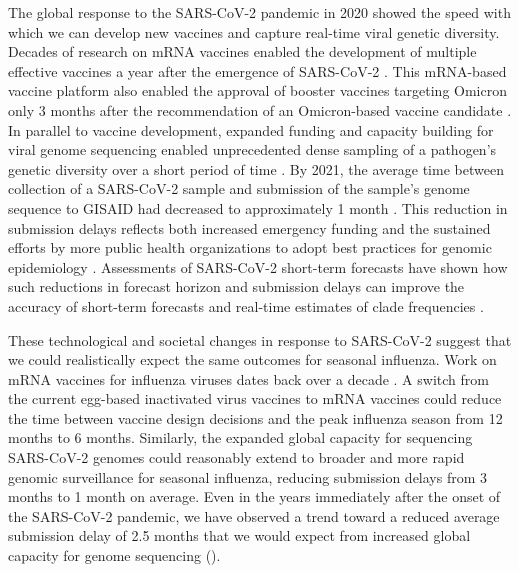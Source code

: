 \documentclass[9pt,lineno]{elife}
\begin{document}
The global response to the SARS-CoV-2 pandemic in 2020 showed the speed with which we can develop new vaccines and capture real-time viral genetic diversity.
Decades of research on mRNA vaccines enabled the development of multiple effective vaccines a year after the emergence of SARS-CoV-2 \citep{Mulligan2020,Baden2021}.
This mRNA-based vaccine platform also enabled the approval of booster vaccines targeting Omicron only 3 months after the recommendation of an Omicron-based vaccine candidate \citep{Grant2023}.
In parallel to vaccine development, expanded funding and capacity building for viral genome sequencing enabled unprecedented dense sampling of a pathogen's genetic diversity over a short period of time \citep{Chen2022}.
By 2021, the average time between collection of a SARS-CoV-2 sample and submission of the sample's genome sequence to GISAID had decreased to approximately 1 month \citep{Brito2022}.
This reduction in submission delays reflects both increased emergency funding and the sustained efforts by more public health organizations to adopt best practices for genomic epidemiology \citep{Kalia2021,Black2020}.
Assessments of SARS-CoV-2 short-term forecasts have shown how such reductions in forecast horizon and submission delays can improve the accuracy of short-term forecasts and real-time estimates of clade frequencies \citep{Abousamra2023}.

These technological and societal changes in response to SARS-CoV-2 suggest that we could realistically expect the same outcomes for seasonal influenza.
Work on mRNA vaccines for influenza viruses dates back over a decade \citep{Petsch2012,Brazzoli2016,Pardi2018,Feldman2019}.
A switch from the current egg-based inactivated virus vaccines to mRNA vaccines could reduce the time between vaccine design decisions and the peak influenza season from 12 months to 6 months.
Similarly, the expanded global capacity for sequencing SARS-CoV-2 genomes could reasonably extend to broader and more rapid genomic surveillance for seasonal influenza, reducing submission delays from 3 months to 1 month on average.
Even in the years immediately after the onset of the SARS-CoV-2 pandemic, we have observed a trend toward a reduced average submission delay of 2.5 months that we would expect from increased global capacity for genome sequencing ().
\end{document}
